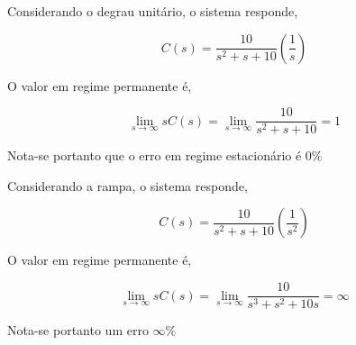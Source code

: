 \documentclass[paper=a4, fontsize=11pt]{article}
\begin{document}
Considerando o degrau unitário, o sistema responde,

$$
C(s) = \frac{10}{s^2 +  s + 10}\left(\frac{1}{s}\right)
$$

O valor em regime permanente é,

$$
\lim_{s \to \infty}{s C(s)} = \lim_{s \to \infty}{\frac{10}{s^2 +  s + 10}} = 1
$$

Nota-se portanto que o erro em regime estacionário é $0 \%$

Considerando a rampa, o sistema responde,

$$
C(s) = \frac{10}{s^2 +  s + 10}\left(\frac{1}{s^2}\right)
$$

O valor em regime permanente é,

$$
\lim_{s \to \infty}{s C(s)} = \lim_{s \to \infty}{\frac{10}{s^3 +  s^2 + 10 s}} = \infty
$$

Nota-se portanto um erro $\infty \%$
\end{document}
